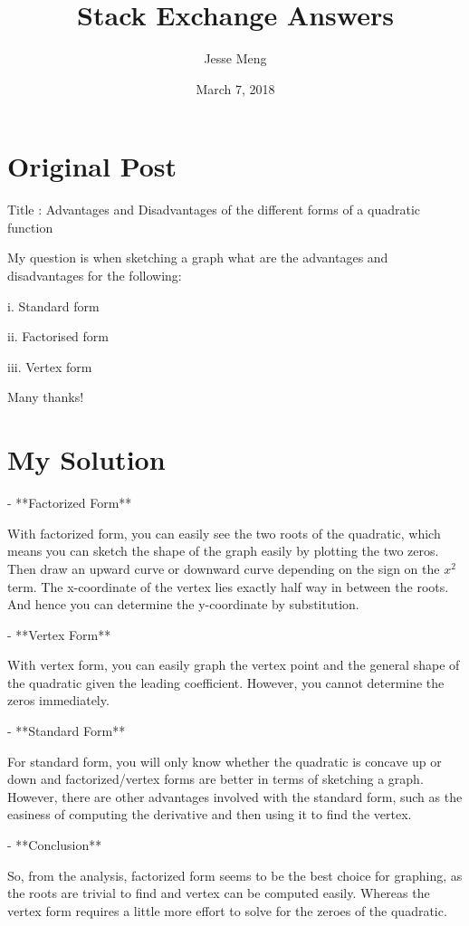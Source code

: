 \documentclass{article}
\title{Stack Exchange Answers}
\author{Jesse Meng }
\date{March 7, 2018}
\begin{document}
\maketitle

\section{Original Post}
Title : Advantages and Disadvantages of the different forms of a quadratic function

My question is when sketching a graph what are the advantages and disadvantages for the following:

i. Standard form

ii. Factorised form 

iii. Vertex form 

Many thanks!

\section{My Solution}
- **Factorized Form**

With factorized form, you can easily see the two roots of the quadratic, which means you can sketch the shape of the graph easily by plotting the two zeros. Then draw an upward curve or downward curve depending on the sign on the $x^2$ term. The x-coordinate of the vertex lies exactly half way in between the roots. And hence you can determine the y-coordinate by substitution.

 - **Vertex Form**

With vertex form, you can easily graph the vertex point and the general shape of the quadratic given the leading coefficient. However, you cannot determine the zeros immediately.

 - **Standard Form**

For standard form, you will only know whether the quadratic is concave up or down and factorized/vertex forms are better in terms of sketching a graph. However, there are other advantages involved with the standard form, such as the easiness of computing the derivative and then using it to find the vertex. 

- **Conclusion**

So, from the analysis, factorized form seems to be the best choice for graphing, as the roots are trivial to find and vertex can be computed easily. Whereas the vertex form requires a little more effort to solve for the zeroes of the quadratic.
\end{document}
